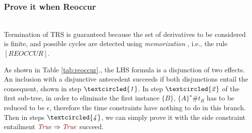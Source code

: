 \documentclass[acmsmall,10pt,review]{acmart}
\newcommand{\effect}{\textcolor{black}{\ensuremath{\mathrm{\Phi}}}}
\newcommand{\code}[1]{{\tt{\ensuremath{\m{#1}}}}}
\newcommand{\CONTAIN}{\sqsubseteq}
\newcommand{\m}{\mathit}
\newcommand\tabref[1]{Table \textcolor{black}{\ref{#1}}.}
\begin{document}
\subsubsection{Prove it when Reoccur}~\\

      \vspace{-2mm}
Termination of TRS is guaranteed because the set of derivatives to be considered is finite, and possible cycles are detected using \emph{memorization} \cite{brotherston2005cyclic}, i.e., the rule \code{[REOCCUR]}. %






As shown in \tabref{tab:reoccur}, the LHS formula is a disjunction of two effects. An inclusion with a disjunctive antecedent succeeds if both disjunctions entail the consequent, shown in step \code{\textcircled{1}}.  
In step \code{\textcircled{2}} of the first sub-tree, in order to eliminate the first instance \code{\{B\}}, \code{\{A\}^\star \# t_R} has to be reduced to be \code{\epsilon}, therefore the time constraints have nothing to do in this branch. 
Then in steps \code{\code{\textcircled{4}}}, we
can simply prove it with the side constraint entailment \code{\textcolor {darkred}{True} \Rightarrow  \textcolor {darkred}{True}} succeed.
\end{document}
